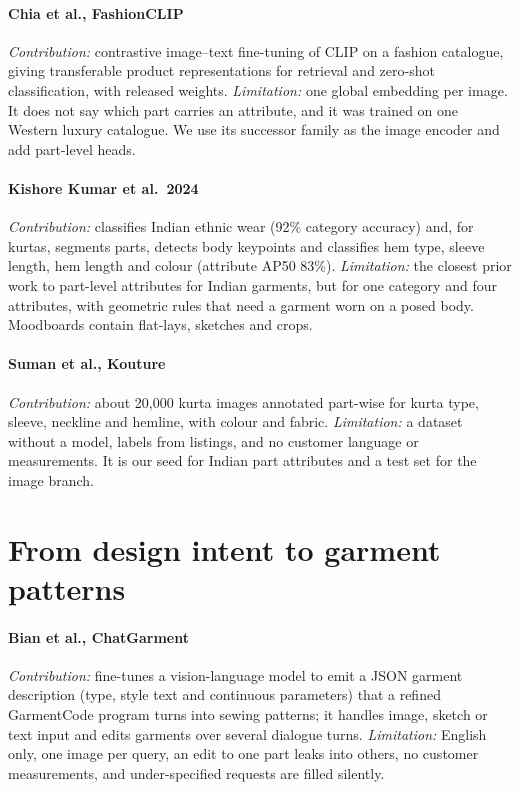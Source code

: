 \paragraph{Chia et al., FashionCLIP \cite{chia2022fashionclip}} \emph{Contribution:} contrastive image--text fine-tuning of CLIP on a fashion catalogue, giving transferable product representations for retrieval and zero-shot classification, with released weights. \emph{Limitation:} one global embedding per image. It does not say which part carries an attribute, and it was trained on one Western luxury catalogue. We use its successor family as the image encoder and add part-level heads.

\paragraph{Kishore Kumar et al.\ 2024 \cite{kumar2024ethnic}} \emph{Contribution:} classifies Indian ethnic wear (92\% category accuracy) and, for kurtas, segments parts, detects body keypoints and classifies hem type, sleeve length, hem length and colour (attribute AP50 83\%). \emph{Limitation:} the closest prior work to part-level attributes for Indian garments, but for one category and four attributes, with geometric rules that need a garment worn on a posed body. Moodboards contain flat-lays, sketches and crops.

\paragraph{Suman et al., Kouture \cite{suman2025kouture}} \emph{Contribution:} about 20,000 kurta images annotated part-wise for kurta type, sleeve, neckline and hemline, with colour and fabric. \emph{Limitation:} a dataset without a model, labels from listings, and no customer language or measurements. It is our seed for Indian part attributes and a test set for the image branch.

\section{From design intent to garment patterns}

\paragraph{Bian et al., ChatGarment \cite{bian2025chatgarment}} \emph{Contribution:} fine-tunes a vision-language model to emit a JSON garment description (type, style text and continuous parameters) that a refined GarmentCode program turns into sewing patterns; it handles image, sketch or text input and edits garments over several dialogue turns. \emph{Limitation:} English only, one image per query, an edit to one part leaks into others, no customer measurements, and under-specified requests are filled silently.

